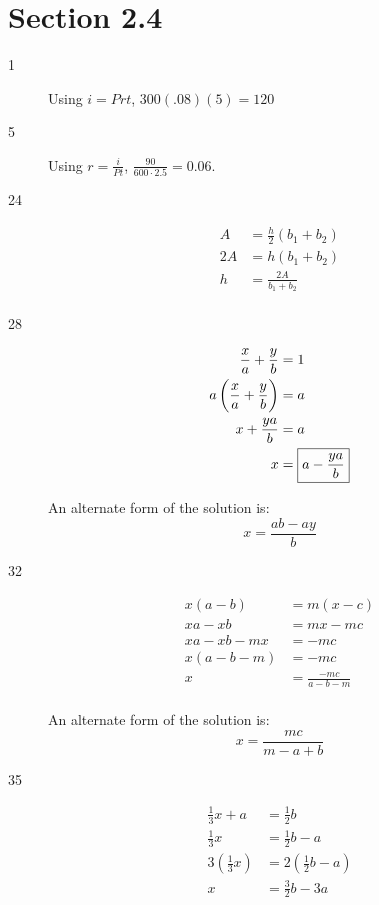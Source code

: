 \documentclass[letterpaper, landscape]{exam}
\begin{document}
    \section{Section 2.4} %
    \begin{description}
      
      \item[1] Using $i = Prt$, $300(.08)(5) = \boxed{ 120 }$

      \item[5] Using \(r = \frac{i}{Pt}\), \(\frac{90}{600 \cdot 2.5} = \boxed{ 0.06 } \).

      \item[24]
        \begin{align*}
          A  & = \frac{h}{2} (b_1 + b_2) \\
          2A & = h(b_1 + b_2) \\
          h  & = \frac{2A}{b_1 + b_2} \\
        \end{align*}

      \item[28]
      \begin{align*}
        \frac{x}{a} + \frac{y}{b}           & = 1 \\
        a \del{ \frac{x}{a} + \frac{y}{b} } & = a  \\
        x + \frac{ya}{b}                    & = a  \\
        x                                   & = \boxed{ a - \frac{ya}{b} } \\
      \end{align*}

      An alternate form of the solution is: 
      \[
        \boxed{ x = \frac{ab - ay}{b} } 
      \]

      \item[32]
        \begin{align*}
          x(a-b)   & = m(x-c) \\
          xa-xb    & = mx-mc \\
          xa-xb-mx & = -mc \\
          x(a-b-m) & = -mc \\
          x        & = \frac{-mc}{a-b-m} \\
        \end{align*}

      An alternate form of the solution is: 
      \[
        \boxed{ x = \frac{mc}{m - a + b} } 
      \]

      \item[35]
      \begin{align*}
        \frac{1}{3}x + a & = \frac{1}{2}b \\
        \frac{1}{3}x     & = \frac{1}{2}b - a \\
        3(\frac{1}{3}x)  & = 2(\frac{1}{2}b - a) \\
        x                & = \boxed{ \frac{3}{2}b - 3a } \\
      \end{align*}


\end{description}
\end{document}

